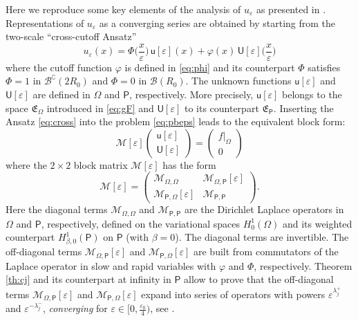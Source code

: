 \documentclass[titlepage,12pt]{amsart}
\theoremstyle{definition}
\theoremstyle{remark}
\numberwithin{equation}{section}
\newcommand{\on}[1]{\big|_{#1}}
\newcommand{\sB}{{\mathscr B}}
\newcommand\cM{{\mathcal{M}}}
\newcommand{\rP}{{\mathsf{P}}}
\newcommand{\sfu}{{\mathsf u}}
\newcommand{\sfU}{{\mathsf U}}
\newcommand {\gE}{\mathfrak{E}}
\begin{document}
Here we reproduce some key elements of the analysis of $u_\varepsilon$ as presented in \cite{CoDa2Mu:2024}. Representations of $u_\varepsilon$ as a converging series are obtained by starting from the  two-scale ``cross-cutoff Ansatz''
\begin{equation}
\label{eq:cross}
  u_\varepsilon(x) = 
  \Phi\Big(\frac{x}{\varepsilon}\Big) \,\sfu[\varepsilon](x)
   + \varphi(x) \,\sfU[\varepsilon]\Big(\frac{x}{\varepsilon}\Big)
\end{equation}
where the cutoff function $\varphi$ is defined in \eqref{eq:phi} and its counterpart $\Phi$ satisfies
$\Phi = 1$  in  $\sB^\complement(2R_0)$ and 
$\Phi = 0$  in $\sB(R_0)$. The unknown functions $\sfu[\varepsilon]$ and $\sfU[\varepsilon]$ are defined in $\Omega$ and $\rP$, respectively. More precisely, $\sfu[\varepsilon]$ belongs to the space $\gE_\Omega$ introduced in \eqref{eq:gF} and $\sfU[\varepsilon]$ to its counterpart $\gE_\rP$. Inserting the Ansatz \eqref{eq:cross} into the problem \eqref{eq:pbeps} leads to the equivalent block form:
\begin{equation}
\label{eq:Meps}
   \cM[\varepsilon]
   \begin{pmatrix} \sfu[\varepsilon] \\[0.3ex] \sfU[\varepsilon] \end{pmatrix}
   = \begin{pmatrix}  f \on \Omega \\ 0 \end{pmatrix}
\end{equation}
where the $2\times2$ block matrix $\cM[\varepsilon]$ has the form
\[
   \cM[\varepsilon] =
   \begin{pmatrix}
   \cM_{\Omega,\Omega} & \cM_{\Omega,\rP}[\varepsilon]\\
   \cM_{\rP,\Omega}[\varepsilon] & \cM_{\rP,\rP}
   \end{pmatrix}.
\]
Here the diagonal terms $\cM_{\Omega,\Omega}$ and $\cM_{\rP,\rP}$ are the Dirichlet Laplace operators in $\Omega$ and $\rP$, respectively, defined on the variational spaces $H^1_0(\Omega)$ and its weighted counterpart $H^1_{\beta,0}(\rP)$ on $\rP$ (with $\beta=0$). The diagonal terms are invertible. The off-diagonal terms $\cM_{\Omega,\rP}[\varepsilon]$ and $\cM_{\rP,\Omega}[\varepsilon]$ are built from commutators of the Laplace operator in slow and rapid variables with $\varphi$ and $\Phi$, respectively. 
Theorem \ref{th:cj} and its counterpart at infinity in $\rP$ allow to prove that the off-diagonal terms $\cM_{\Omega,\rP}[\varepsilon]$ and $\cM_{\rP,\Omega}[\varepsilon]$ expand into series of operators with  powers $\varepsilon^{\lambda^+_j}$ and $\varepsilon^{-\lambda^-_j}$, {\em converging} for $\varepsilon\in[0,\frac{\varepsilon_0}{4})$, see \cite[Th.\,4.11]{CoDa2Mu:2024}.
\end{document}
